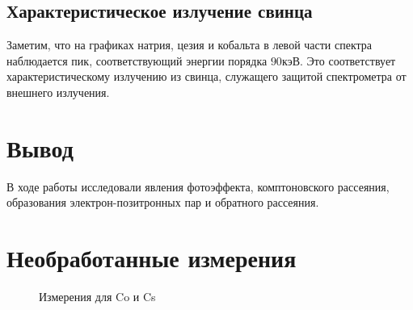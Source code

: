 \documentclass[a4paper, 12pt]{article}
\begin{document}
        \subsection{Характеристическое излучение свинца}

            Заметим, что на графиках натрия, цезия и кобальта в левой части спектра наблюдается пик, соответствующий энергии порядка $90 кэВ$. Это соответствует характеристическому излучению из свинца, служащего защитой спектрометра от внешнего излучения.

    \section{Вывод}

        В ходе работы исследовали явления фотоэффекта, комптоновского рассеяния, образования электрон-позитронных пар и обратного рассеяния.

    \section{Необработанные измерения}

        \begin{figure}[ht!]
            \centering
            \qquad
            \caption{Измерения для Co и Cs}%
            \label{img:co_cs}%
        \end{figure}
\end{document}
